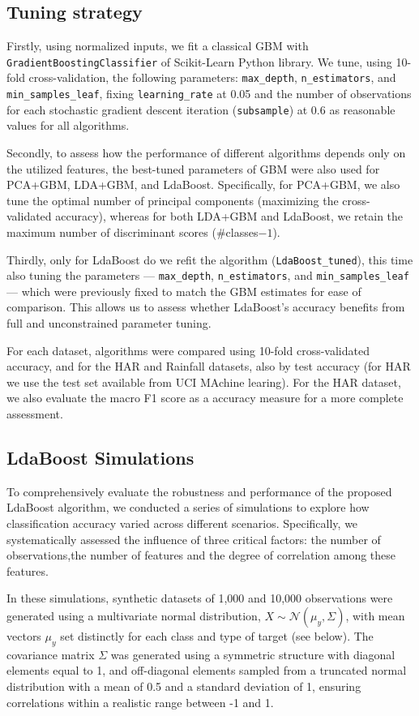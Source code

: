 \documentclass[11pt,a4paper]{article}
\begin{document}
\subsection*{Tuning strategy}
Firstly, using normalized inputs, we fit a classical GBM with \texttt{GradientBoostingClassifier} of Scikit-Learn Python library.
We tune, using 10-fold cross-validation, the following parameters:  \texttt{max\_depth}, \texttt{n\_estimators}, and \texttt{min\_samples\_leaf}, fixing \texttt{learning\_rate} at 0.05 and the number of observations for each stochastic gradient descent iteration (\texttt{subsample}) at 0.6 as reasonable values for all algorithms.

Secondly, to assess how the performance of different algorithms depends only on the utilized features, the best-tuned parameters of GBM were also used for PCA+GBM, LDA+GBM, and LdaBoost. Specifically, for PCA+GBM, we also tune the optimal number of principal components (maximizing the cross-validated accuracy), whereas for both LDA+GBM and LdaBoost, we retain the maximum number of discriminant scores (\#classes$-1$).

Thirdly, only for LdaBoost do we refit the algorithm (\texttt{LdaBoost\_tuned}), this time also tuning the parameters — \texttt{max\_depth}, \texttt{n\_estimators}, and \texttt{min\_samples\_leaf} — which were previously fixed to match the GBM estimates for ease of comparison. This allows us to assess whether LdaBoost's accuracy benefits from full and unconstrained parameter tuning.

For each dataset, algorithms were compared using 10-fold cross-validated accuracy, and for the HAR and Rainfall datasets, also by test accuracy (for HAR we use the test set available from UCI MAchine learing). 
For the HAR dataset, we also evaluate the macro F1 score as a accuracy measure for a more complete assessment.


\subsection*{LdaBoost Simulations}
To comprehensively evaluate the robustness and performance of the proposed LdaBoost algorithm, we conducted a series of simulations to explore how classification accuracy varied across different scenarios. Specifically, we systematically assessed the influence of three critical factors: the number of observations,the number of features and the degree of correlation among these features.

In these simulations, synthetic datasets of 1,000 and 10,000 observations were generated using a multivariate normal distribution, $X \sim \mathcal{N}(\mu_y, \Sigma)$, with mean vectors $\mu_y$ set distinctly for each class and type of target (see below). The covariance matrix $\Sigma$ was generated using a symmetric structure with diagonal elements equal to 1, and off-diagonal elements sampled from a truncated normal distribution with a mean of 0.5 and a standard deviation of 1, ensuring correlations within a realistic range between -1 and 1.
\end{document}
